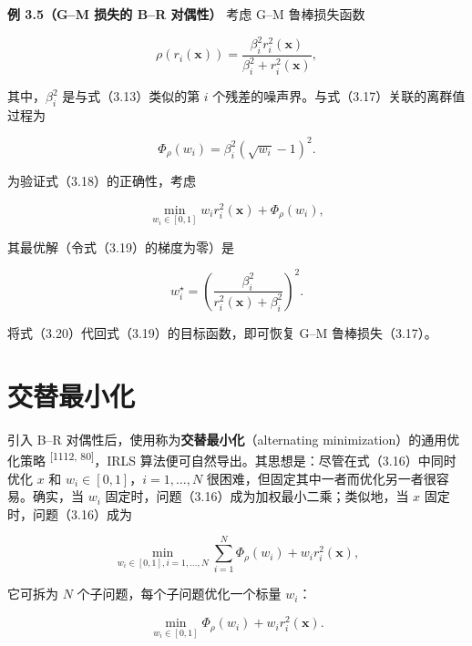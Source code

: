 \textbf{例 3.5（G–M 损失的 B–R 对偶性）} 考虑 G–M 鲁棒损失函数

\begin{equation}
\rho (r _ {i} (\pmb {x})) = \frac {\beta_ {i} ^ {2} r _ {i} ^ {2} (\pmb {x})}{\beta_ {i} ^ {2} + r _ {i} ^ {2} (\pmb {x})},\tag{3.17}
\end{equation}

其中，$\beta _ { i } ^ { 2 }$ 是与式（3.13）类似的第 $i$ 个残差的噪声界。与式（3.17）关联的离群值过程为

\begin{equation}
\Phi_ {\rho} (w _ {i}) = \beta_ {i} ^ {2} (\sqrt {w _ {i}} - 1) ^ {2}.\tag{3.18}
\end{equation}

为验证式（3.18）的正确性，考虑

\begin{equation}
\min _ {w _ {i} \in [ 0, 1 ]} w _ {i} r _ {i} ^ {2} (\boldsymbol {x}) + \Phi_ {\rho} (w _ {i}),\tag{3.19}
\end{equation}

其最优解（令式（3.19）的梯度为零）是

\begin{equation}
w _ {i} ^ {\star} = \left(\frac {\beta_ {i} ^ {2}}{r _ {i} ^ {2} (\pmb {x}) + \beta_ {i} ^ {2}}\right) ^ {2}.\tag{3.20}
\end{equation}

将式（3.20）代回式（3.19）的目标函数，即可恢复 G–M 鲁棒损失（3.17）。

\section{交替最小化}

引入 B–R 对偶性后，使用称为\textbf{交替最小化}（alternating minimization）的通用优化策略 \textsuperscript{[1112, 80]}，IRLS 算法便可自然导出。其思想是：尽管在式（3.16）中同时优化 $x$ 和 $w _ { i } \in [ 0 , 1 ]$，$i = 1 , \ldots , N$ 很困难，但固定其中一者而优化另一者很容易。确实，当 $w _ { i }$ 固定时，问题（3.16）成为加权最小二乘；类似地，当 $x$ 固定时，问题（3.16）成为

\begin{equation*}
\min _ {w _ {i} \in [ 0, 1 ], i = 1, \dots , N} \sum_ {i = 1} ^ {N} \Phi_ {\rho} (w _ {i}) + w _ {i} r _ {i} ^ {2} (\boldsymbol {x}),
\end{equation*}

它可拆为 $N$ 个子问题，每个子问题优化一个标量 $w _ { i }$：

\begin{equation}
\min _ {w _ {i} \in [ 0, 1 ]} \Phi_ {\rho} (w _ {i}) + w _ {i} r _ {i} ^ {2} (\boldsymbol {x}).\tag{3.21}
\end{equation}

